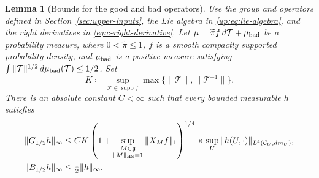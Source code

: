 \documentclass[11pt]{article}
\numberwithin{equation}{section}
\newtheorem{lemma}[theorem]{Lemma}
\theoremstyle{remark}
\newcommand{\supp}{\operatorname{supp}}
\begin{document}
\begin{lemma}[Bounds for the good and bad operators]\label{lem:c-operators}
Use the group and operators defined in Section~\ref{sec:upper-inputs},
the Lie algebra in \eqref{up:eq:lie-algebra}, and the right derivatives
in \eqref{eq:c-right-derivative}.
Let $\mu=\widetilde{\pi}f\,d\mathcal T+\mu_{\rm bad}$ be a probability measure,
where $0<\widetilde{\pi}\le1$, $f$ is a smooth compactly supported
probability density, and $\mu_{\rm bad}$ is a positive measure satisfying
$\int\|\mathcal T\|^{1/2}\,d\mu_{\rm bad}(\mathcal T)\le1/2$. Set
\[
 K\coloneqq\sup_{\mathcal T\in\supp f}\max\{\|\mathcal T\|,\|\mathcal T^{-1}\|\}.
\]
There is an absolute constant $C<\infty$ such that every bounded
measurable $h$ satisfies
\begin{align}
 \|G_{1/2}h\|_\infty
 &\le CK\left(1+
 \sup_{\substack{M\in\mathfrak g\\\|M\|_{\rm HS}=1}}\|X_Mf\|_1
          \right)^{1/4}
 \times\sup_U\|h(U,\cdot)\|_{L^4(\mathcal C_U,dm_U)},
 \label{cc:eq:smoothing}\\
 \|B_{1/2}h\|_\infty&\le\tfrac12\|h\|_\infty.
 \label{eq:c-bad-operator}
\end{align}
\end{lemma}
\end{document}
